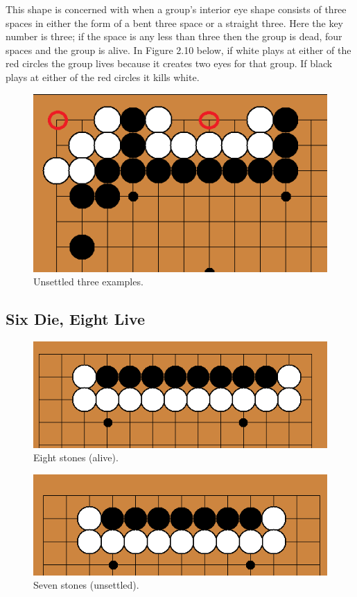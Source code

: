 \documentclass{l3proj}
\begin{document}
This shape is concerned with when a group's interior eye shape consists of three spaces in either the form of a bent three space or a straight three. Here the key number is three; if the space is any less than three then the group is dead, four spaces and the group is alive. In Figure 2.10 below, if white plays at either of the red circles the group lives because it creates two eyes for that group. If black plays at either of the red circles it kills white.

\begin{figure}[H]
\centering
\includegraphics[scale=0.5]{Images/unsettled3.png}
\caption{Unsettled three examples.}
\end{figure}

\subsection{Six Die, Eight Live}

\begin{figure}[H]
\centering
\includegraphics[scale=0.5]{Images/eightlive.png}
\caption{Eight stones (alive).}
\end{figure}

\begin{figure}[H]
\centering
\includegraphics[scale=0.5]{Images/sevenunsettled.png}
\caption{Seven stones (unsettled).}
\end{figure}
\end{document}

